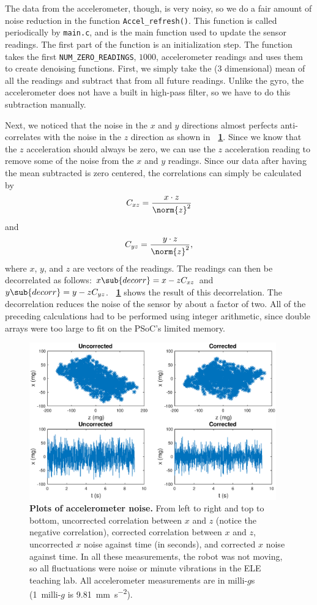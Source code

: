 \documentclass[letterpaper, 11pt]{article}
\newcommand*{\figref}[1]{\textbf{\figurename~\ref{#1}}}
\begin{document}
The data from the accelerometer, though, is very noisy, so we do a fair amount of noise reduction in the function \verb|Accel_refresh()|. This function is called periodically by \verb|main.c|, and is the main function used to update the sensor readings. The first part of the function is an initialization step. The function takes the first \verb|NUM_ZERO_READINGS|, $1000$, accelerometer readings and uses them to create denoising functions. First, we simply take the (3 dimensional) mean of all the readings and subtract that from all future readings. Unlike the gyro, the accelerometer does not have a built in high-pass filter, so we have to do this subtraction manually. 

Next, we noticed that the noise in the $x$ and $y$ directions almost perfects anti-correlates with the noise in the $z$ direction as shown in \figref{fig:accel-plots}. Since we know that the $z$ acceleration should always be zero, we can use the $z$ acceleration reading to remove some of the noise from the $x$ and $y$ readings. Since our data after having the mean subtracted is zero centered, the correlations can simply be calculated by \[C_{xz} = \frac{x \cdot z}{\norm{z}^2}\] and \[C_{yz} = \frac{y \cdot z}{\norm{z}^2},\] where $x$, $y$, and $z$ are vectors of the readings. The readings can then be decorrelated as follows: $x\sub{decorr} = x - zC_{xz}$ and $y\sub{decorr} = y - zC_{yz}$. \figref{fig:accel-plots} shows the result of this decorrelation. The decorrelation reduces the noise of the sensor by about a factor of two. All of the preceding calculations had to be performed using integer arithmetic, since double arrays were too large to fit on the PSoC's limited memory.

\begin{figure}[ht]
    \centering
    \includegraphics[width=0.95\textwidth]{images/accel-plots.eps}
    \caption{\textbf{Plots of accelerometer noise.} From left to right and top to bottom, uncorrected correlation between $x$ and $z$ (notice the negative correlation), corrected correlation between $x$ and $z$, uncorrected $x$ noise against time (in seconds), and corrected $x$ noise against time. In all these measurements, the robot was not moving, so all fluctuations were noise or minute vibrations in the ELE teaching lab. All accelerometer measurements are in milli-$g$s (1~milli-$g$ is \SI{9.81}{\milli\meter\per\second\squared}).}
    \label{fig:accel-plots}
\end{figure}
\end{document}

